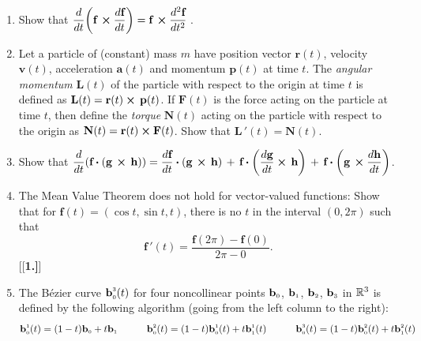 \begin{enumerate}[\bfseries 1.]
\begin{enumerate}[(a)]
    difference in the two derivatives?
  \end{enumerate}
 \item Show that $\dfrac{d}{dt} \biggl( \textbf{f}\, \bm{\times} \dfrac{d\textbf{f}}{dt} \biggr) =
  \textbf{f}\, \bm{\times} \dfrac{d^2 \textbf{f}}{dt^2}\;$.
 \item Let a particle of (constant) mass $m$ have position vector $\textbf{r}(t)$, velocity $\textbf{v}(t)$,
  acceleration $\textbf{a}(t)$ and momentum $\textbf{p}(t)$ at time $t$. The \emph{angular momentum} $\textbf{L}(t)$ of
  the particle with respect to the origin at time $t$ is defined as $\textbf{L}(t) =
  \textbf{r}(t) \bm{\times} \,\textbf{p}(t)$. If $\textbf{F}(t)$ is the force acting on the particle at time $t$, then
  define the \emph{torque} $\textbf{N}(t)$ acting on the particle with respect to the origin as
  $\textbf{N}(t) = \textbf{r}(t) \bm{\times} \textbf{F}(t)$. Show that $\textbf{L}\,'(t) = \textbf{N}(t)$.
 \item Show that $\dfrac{d}{dt} ( \textbf{f} \bm{\cdot} ( \textbf{g}\, \bm{\times} \,\textbf{h} ) ) =
  \dfrac{d\textbf{f}}{dt} \bm{\cdot} (\textbf{g}\, \bm{\times} \,\textbf{h}) \,+\,
  \textbf{f} \bm{\cdot} \biggl(\dfrac{d \textbf{g}}{dt} \bm{\times} \,\textbf{h}\biggr) \,+\,
  \textbf{f} \bm{\cdot} \biggl(\textbf{g}\, \bm{\times} \dfrac{d \textbf{h}}{dt}\biggr)$.
 \item The Mean Value Theorem does not hold for vector-valued functions:
 Show that for $\textbf{f}(t) = (\cos t, \sin t,t)$, there is no $t$ in the interval $(0,2\pi)$ such that
 \[
  \textbf{f}\,'(t) = \dfrac{\textbf{f}(2\pi) - \textbf{f}(0)}{2\pi - 0} .
 \]
[{[\bfseries 1.]}]
 \item The B\'{e}zier curve $\textbf{b}_{\scriptscriptstyle 0}^{\scriptscriptstyle 3}(t)$ for four noncollinear points
  $\textbf{b}_{\scriptscriptstyle 0}$, $\textbf{b}_{\scriptscriptstyle 1}$, $\textbf{b}_{\scriptscriptstyle 2}$, $\textbf{b}_{\scriptscriptstyle 3}$ in $\mathbb{R}^{3}$ is
  defined by the following algorithm (going from the left column to the right):
  \begin{alignat*}{3}
   \ssub{\textbf{b}}{0}^{\scriptscriptstyle 1}(t) &= ( 1 - t )\ssub{\textbf{b}}{0} + t \ssub{\textbf{b}}{1} \qquad
    & \ssub{\textbf{b}}{0}^{\scriptscriptstyle 2}(t) &=
    ( 1 - t )\ssub{\textbf{b}}{0}^{\scriptscriptstyle 1}(t) + t \ssub{\textbf{b}}{1}^{\scriptscriptstyle 1}(t) \qquad
    & \ssub{\textbf{b}}{0}^{\scriptscriptstyle 3}(t) &=
    ( 1 - t )\ssub{\textbf{b}}{0}^{\scriptscriptstyle 2}(t) + t \ssub{\textbf{b}}{1}^{\scriptscriptstyle 2}(t)\\

\end{alignat*}
\end{enumerate}
